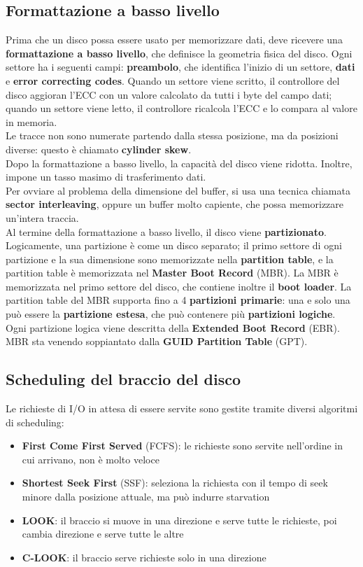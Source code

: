 \documentclass[12pt]{article}
\begin{document}
\subsection{Formattazione a basso livello}
Prima che un disco possa essere usato per memorizzare dati, deve ricevere una \textbf{formattazione a basso livello}, che 
definisce la geometria fisica del disco. Ogni settore ha i seguenti campi: \textbf{preambolo}, che identifica l'inizio di 
un settore, \textbf{dati} e \textbf{error correcting codes}. Quando un settore viene scritto, il controllore del disco 
aggioran l'ECC con un valore calcolato da tutti i byte del campo dati; quando un settore viene letto, il controllore ricalcola 
l'ECC e lo compara al valore in memoria.\\
Le tracce non sono numerate partendo dalla stessa posizione, ma da posizioni diverse: questo è chiamato \textbf{cylinder skew}.\\
Dopo la formattazione a basso livello, la capacità del disco viene ridotta. Inoltre, impone un tasso masimo di trasferimento 
dati.\\
Per ovviare al problema della dimensione del buffer, si usa una tecnica chiamata \textbf{sector interleaving}, oppure un 
buffer molto capiente, che possa memorizzare un'intera traccia.\\
Al termine della formattazione a basso livello, il disco viene \textbf{partizionato}. Logicamente, una partizione è come 
un disco separato; il primo settore di ogni partizione e la sua dimensione sono memorizzate nella \textbf{partition table}, 
e la partition table è memorizzata nel \textbf{Master Boot Record} (MBR). La MBR è memorizzata nel primo settore del disco, che 
contiene inoltre il \textbf{boot loader}. La partition table del MBR supporta fino a 4 \textbf{partizioni primarie}: una 
e solo una può essere la \textbf{partizione estesa}, che può contenere più \textbf{partizioni logiche}. Ogni partizione 
logica viene descritta della \textbf{Extended Boot Record} (EBR). MBR sta venendo soppiantato dalla \textbf{GUID Partition Table} 
(GPT).
\subsection{Scheduling del braccio del disco}
Le richieste di I/O in attesa di essere servite sono gestite tramite diversi algoritmi di scheduling:
\begin{itemize}
    \item \textbf{First Come First Served} (FCFS): le richieste sono servite nell'ordine in cui arrivano, non è molto veloce 
    \item \textbf{Shortest Seek First} (SSF): seleziona la richiesta con il tempo di seek minore dalla posizione attuale, 
    ma può indurre starvation
    \item \textbf{LOOK}: il braccio si muove in una direzione e serve tutte le richieste, poi cambia direzione e serve tutte 
    le altre 
    \item \textbf{C-LOOK}: il braccio serve richieste solo in una direzione 
\end{itemize}
\end{document}
